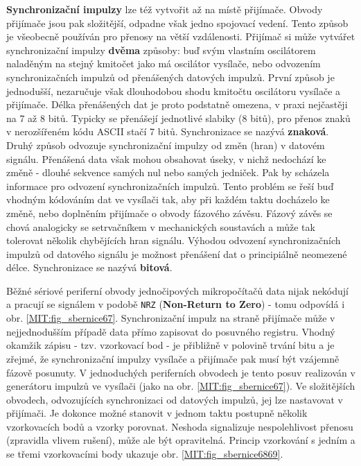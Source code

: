         \textbf{Synchronizační impulzy} lze též vytvořit až na místě přijímače. Obvody přijímače 
        jsou pak složitější, odpadne však jedno spojovací vedení. Tento způsob je všeobecně 
        používán pro přenosy na větší vzdálenosti. Přijímač si může vytvářet synchronizační impulzy 
        \textbf{dvěma} způsoby: buď svým vlastním oscilátorem naladěným na stejný kmitočet jako má 
        oscilátor vysílače, nebo odvozením synchronizačních impulzů od přenášených datových 
        impulzů. První způsob je jednodušší, nezaručuje však dlouhodobou shodu kmitočtu oscilátoru 
        vysílače a přijímače. Délka přenášených dat je proto podstatně omezena, v praxi nejčastěji 
        na 7 až 8 bitů. Typicky se přenášejí jednotlivé slabiky (8 bitů), pro přenos znaků v 
        nerozšířeném kódu ASCII stačí 7 bitů. Synchronizace se nazývá \textbf{znaková}. Druhý 
        způsob odvozuje synchronizační impulzy od změn (hran) v datovém signálu. Přenášená data 
        však mohou obsahovat úseky, v nichž nedochází ke změně - dlouhé sekvence samých nul nebo 
        samých jedniček. Pak by scházela informace pro odvození synchronizačních impulzů. Tento 
        problém se řeší buď vhodným kódováním dat ve vysílači tak, aby při každém taktu docházelo 
        ke změně, nebo doplněním přijímače o obvody fázového závěsu. Fázový závěs se chová 
        analogicky se setrvačníkem v mechanických soustavách a může tak tolerovat několik 
        chybějících hran signálu. Výhodou odvození synchronizačních impulzů od datového signálu je 
        možnost přenášení dat o principiálně neomezené délce. Synchronizace se nazývá      
        \textbf{bitová}.
        
        Běžné sériové periferní obvody jednočipových mikropočítačů data nijak nekódují a pracují se 
        signálem v podobě \texttt{NRZ} (\textbf{Non-Return to Zero}) - tomu odpovídá i obr. 
        \ref{MIT:fig_sbernice67}. Synchronizační impulz na straně přijímače může v nejjednodušším 
        případě data přímo zapisovat do posuvného registru. Vhodný okamžik zápisu - tzv. vzorkovací 
        bod - je přibližně v polovině trvání bitu a je zřejmé, že synchronizační impulzy vysílače a 
        přijímače pak musí být vzájemně fázově posunuty. V jednoduchých periferních obvodech je 
        tento posuv realizován v generátoru impulzů ve vysílači (jako na obr. 
        \ref{MIT:fig_sbernice67}). Ve složitějších obvodech, odvozujících synchronizaci od datových 
        impulzů, jej lze nastavovat v přijímači. Je dokonce možné stanovit v jednom taktu postupně 
        několik vzorkovacích bodů a vzorky porovnat. Neshoda signalizuje nespolehlivost přenosu 
        (zpravidla vlivem rušení), může ale být opravitelná. Princip vzorkování s jedním a se třemi 
        vzorkovacími body ukazuje obr. \ref{MIT:fig_sbernice6869}.
        
